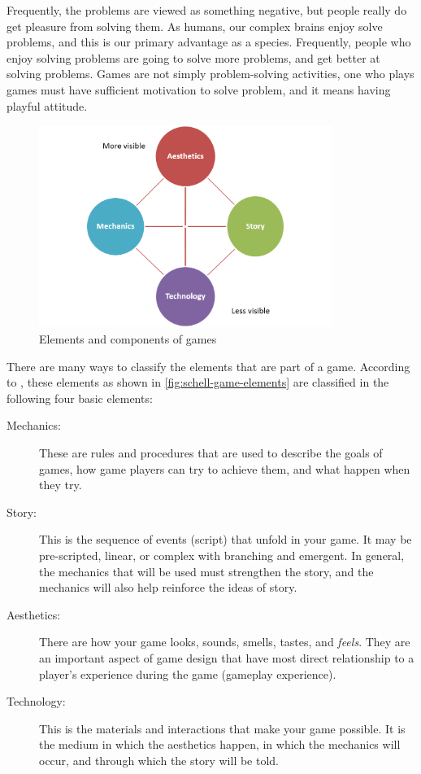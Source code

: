 Frequently, the problems are viewed as something negative, but people really do get pleasure from solving them. As humans, our complex brains enjoy solve problems, and this is our primary advantage as a species. Frequently, people who enjoy solving problems are going to solve more problems, and get better at solving problems. Games are not simply problem-solving activities, one who plays games must have sufficient motivation to solve problem, and it means having playful attitude.

\begin{figure}[htb]
 \caption{Elements and components of games}
 \label{fig:schell-game-elements}
 \centering
 \includegraphics[width=0.85\textwidth]{images/chap-general-background/schell-game-elements.png}
\end{figure}

There are many ways to classify the elements that are part of a game. According to , these elements as shown in \autoref{fig:schell-game-elements} are classified in the following four basic elements:

\begin{description}
\item[Mechanics:] These are rules and procedures that are used to describe the goals of games, how game players can try to achieve them, and what happen when they try.
\item[Story:] This is the sequence of events (script) that unfold in your game. It may be pre-scripted, linear, or complex with branching and emergent. In general, the mechanics that will be used must strengthen the story, and the mechanics will also help reinforce the ideas of story.
\item[Aesthetics:] There are how your game looks, sounds, smells, tastes, and \emph{feels}. They are an important aspect of game design that have most direct relationship to a player's experience during the game (gameplay experience).
\item[Technology:] This is the materials and interactions that make your game possible. It is the medium in which the aesthetics happen, in which the mechanics will occur, and through which the story will be told. 
\end{description}

